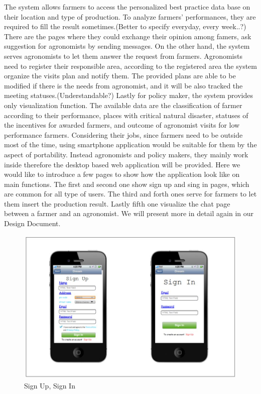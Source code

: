 The system allows farmers to access the personalized best practice data base on their location and type of production. To analyze farmers' performances, they are required to fill the result sometimes.(Better to specify everyday, every week..?) There are the pages where they could exchange their opinion among famers, ask suggestion for agronomists by sending messages. 
\newline
On the other hand, the system serves agronomists to let them answer the request from farmers. 
Agronomists need to register their responsible area, according to the registered area the system organize the visits plan and notify them. The provided plans are able to be modified if there is the needs from agronomist, and it will be also tracked the meeting statuses.(Understandable?)
\newline
Lastly for policy maker, the system provides only visualization function. The available data are the
classification of farmer according to their performance, places with critical natural disaster, statuses of the incentives for awarded farmers, and outcome of agronomist visits for low performance farmers. Considering their jobs, since farmers need to be outside most of the time, using smartphone application would be suitable for them by the aspect of portability. Instead agronomists and policy makers, they mainly work inside therefore the desktop based web application will be provided. 
\newline
\newline
Here we would like to introduce a few pages to show how the application look like on main functions. The first and second one show sign up and sing in pages, which are common for all type of users. The third and forth ones serve for farmers to let them insert the production result. Lastly fifth one visualize the chat page between a farmer and an agronomist. We will present more in detail again in our Design Document. 

\begin{figure}[H]
	\centering
    \includegraphics[page=1, width=\textwidth]{Images/sign_up_in.JPG}

	\caption{\label{fig:FE_image1}Sign Up, Sign In}

\end{figure}

